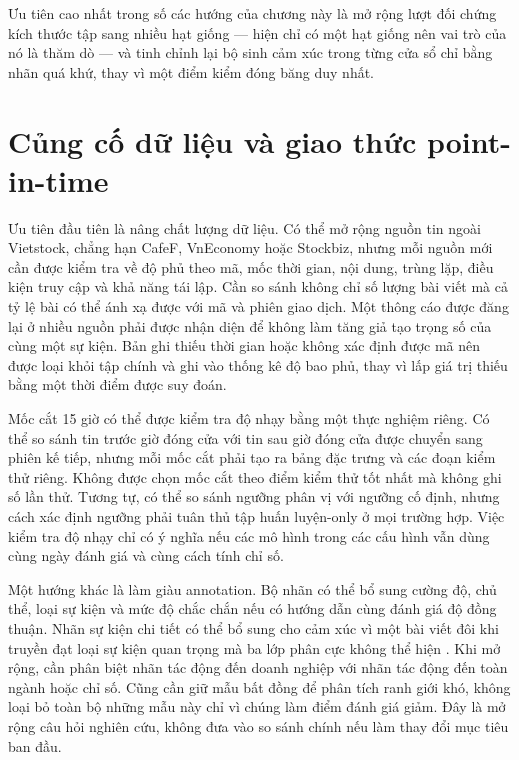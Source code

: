 Ưu tiên cao nhất trong số các hướng của chương này là mở rộng lượt đối chứng kích
thước tập sang nhiều hạt giống --- hiện chỉ có một hạt giống nên vai trò của nó là
thăm dò --- và tinh chỉnh lại bộ sinh cảm xúc trong từng cửa sổ chỉ bằng nhãn quá
khứ, thay vì một điểm kiểm đóng băng duy nhất.

\section{Củng cố dữ liệu và giao thức point-in-time}

Ưu tiên đầu tiên là nâng chất lượng dữ liệu. Có thể mở rộng nguồn tin ngoài Vietstock,
chẳng hạn CafeF, VnEconomy hoặc Stockbiz, nhưng mỗi nguồn mới cần được kiểm tra về độ
phủ theo mã, mốc thời gian, nội dung, trùng lặp, điều kiện truy cập và khả năng tái lập. Cần
so sánh không chỉ số lượng bài viết mà cả tỷ lệ bài có thể ánh xạ được với mã và phiên
giao dịch. Một thông cáo được đăng lại ở nhiều nguồn phải được nhận diện để không làm
tăng giả tạo trọng số của cùng một sự kiện. Bản ghi thiếu thời gian hoặc không xác định
được mã nên được loại khỏi tập chính và ghi vào thống kê độ bao phủ, thay vì lấp giá trị
thiếu bằng một thời điểm được suy đoán.

Mốc cắt 15 giờ có thể được kiểm tra độ nhạy bằng một thực nghiệm riêng. Có thể so
sánh tin trước giờ đóng cửa với tin sau giờ đóng cửa được chuyển sang phiên kế tiếp,
nhưng mỗi mốc cắt phải tạo ra bảng đặc trưng và các đoạn kiểm thử riêng. Không được chọn
mốc cắt theo điểm kiểm thử tốt nhất mà không ghi số lần thử. Tương tự, có thể so sánh
ngưỡng phân vị với ngưỡng cố định, nhưng cách xác định ngưỡng phải tuân thủ tập
huấn luyện-only ở mọi trường hợp. Việc kiểm tra độ nhạy chỉ có ý nghĩa nếu các mô hình
trong các cấu hình vẫn dùng cùng ngày đánh giá và cùng cách tính chỉ số.

Một hướng khác là làm giàu annotation. Bộ nhãn có thể bổ sung cường độ, chủ thể, loại
sự kiện và mức độ chắc chắn nếu có hướng dẫn cùng đánh giá độ đồng thuận. Nhãn sự kiện
chi tiết có thể bổ sung cho cảm xúc vì một bài viết đôi khi truyền đạt loại sự kiện
quan trọng mà ba lớp phân cực không thể hiện \cite{Chen2019_191005078v1}. Khi mở rộng,
cần phân biệt nhãn tác động đến doanh nghiệp với nhãn tác động đến toàn ngành hoặc chỉ
số. Cũng cần giữ mẫu bất đồng để phân tích ranh giới khó, không loại bỏ toàn bộ những
mẫu này chỉ vì chúng làm điểm đánh giá giảm. Đây là mở rộng câu hỏi nghiên cứu, không
đưa vào so sánh chính nếu làm thay đổi mục tiêu ban đầu.

